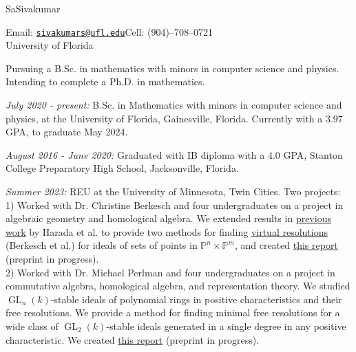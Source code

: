 \documentclass[11pt]{article}
\DeclareMathOperator{\GL}{GL}
\begin{document}
{\huge SaSivakumar}

Email: \href{mailto:sivakumars@ufl.edu}{\texttt{sivakumars@ufl.edu}}\hspace{8cm}Cell: (904)--708--0721\\%
\hspace*{-1cm}University of Florida\\


Pursuing a B.Sc. in mathematics with minors in computer science and physics. Intending to complete a Ph.D. in mathematics.


\textsl{July 2020 - present:} B.Sc. in Mathematics with minors in computer science and physics, at the University of Florida, Gainesville, Florida. Currently with a 3.97 GPA, to graduate May 2024.

\textsl{August 2016 - June 2020:} Graduated with IB diploma with a 4.0 GPA, Stanton College Preparatory High School, Jacksonville, Florida.


\textsl{Summer 2023:} REU at the University of Minnesota, Twin Cities. Two projects: \\
1) Worked with Dr. Christine Berkesch and four undergraduates on a project in algebraic geometry and homological algebra. We extended results in {\color{blue}\href{https://arxiv.org/abs/2106.02759}{previous work}} by Harada et al. to provide two methods for finding {\color{blue}\href{https://arxiv.org/abs/1703.07631}{virtual resolutions}} (Berkesch et al.) for ideals of sets of points in $\mathbb{P}^n\times \mathbb P^m$, and created {\color{blue}\href{https://www-users.cse.umn.edu/~reiner/REU/REU2023notes/2_VResPointsReport.pdf}{this report}} (preprint in progress).\\
2) Worked with Dr. Michael Perlman and four undergraduates on a project in commutative algebra, homological algebra, and representation theory. We studied $\GL_n(k)$-stable ideals of polynomial rings in positive characteristics and their free resolutions. We provide a method for finding minimal free resolutions for a wide class of $\GL_2(k)$-stable ideals generated in a single degree in any positive characteristic. %
We created {\color{blue}\href{https://www-users.cse.umn.edu/~reiner/REU/REU2023notes/4_GL_stable_Ideals_in_Positive_Characteristic.pdf}{this report}} (preprint in progress).
\end{document}
